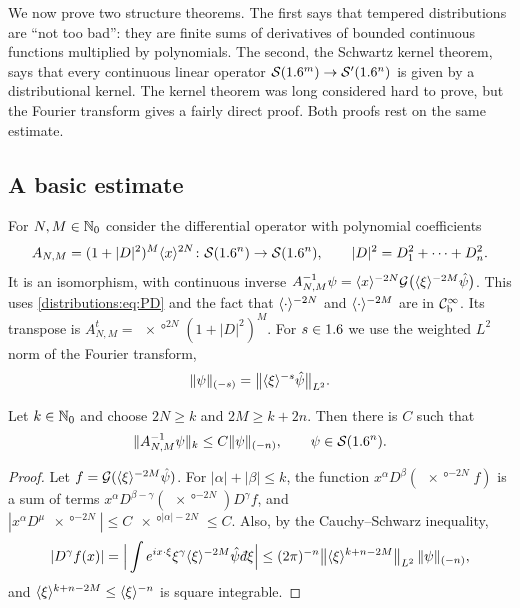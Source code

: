 We now prove two structure theorems. The first says that tempered distributions are
``not too bad'': they are finite sums of derivatives of bounded continuous functions
multiplied by polynomials. The second, the Schwartz kernel theorem, says that every
continuous linear operator $\mathcal{S}(1.6^m)\to\mathcal{S}'(1.6^n)$ is given by a distributional kernel.
The kernel theorem was long considered hard to prove, but the Fourier transform gives a
fairly direct proof. Both proofs rest on the same estimate.

\subsection{A basic estimate}
For $N,M\in\mathbb{N}_0$ consider the differential operator with polynomial coefficients
\[
  A_{N,M}=(1+|D|^2)^M\langle x\rangle^{2N}\colon\mathcal{S}(1.6^n)\to\mathcal{S}(1.6^n),\qquad
  |D|^2=D_1^2+\dots+D_n^2.
\]
It is an isomorphism, with continuous inverse
$A_{N,M}^{-1}\psi=\langle x\rangle^{-2N}\mathcal{G}\big(\langle \xi\rangle^{-2M}\hat\psi\big)$. This uses
\eqref{distributions:eq:PD} and the fact that $\langle \cdot\rangle^{-2N}$ and $\langle \cdot\rangle^{-2M}$
are in $\mathcal{C}^\infty_{\mathrm{b}}$. Its transpose is $A_{N,M}^t=\ang{x}^{2N}(1+|D|^2)^M$. For $s\in1.6$ we
use the weighted $L^2$ norm of the Fourier transform,
\[
  \lVert \psi\rVert_{(-s)}=\big\|\langle \xi\rangle^{-s}\hat\psi\big\|_{L^2}.
\]

\begin{lemma}\label{distributions:lem:basic-est}
Let $k\in\mathbb{N}_0$ and choose $2N\ge k$ and $2M\ge k+2n$. Then there is $C$ such that
\[
  \lVert A_{N,M}^{-1}\psi\rVert_k\le C\lVert \psi\rVert_{(-n)},\qquad\psi\in\mathcal{S}(1.6^n).
\]
\end{lemma}
\begin{proof}
Let $f=\mathcal{G}(\langle \xi\rangle^{-2M}\hat\psi)$. For $|\alpha|+|\beta|\le k$, the function
$x^\alpha D^\beta(\ang{x}^{-2N}f)$ is a sum of terms
$x^\alpha D^{\beta-\gamma}(\ang{x}^{-2N})D^\gamma f$, and
$|x^\alpha D^\mu\ang{x}^{-2N}|\le C\ang{x}^{|\alpha|-2N}\le C$. Also, by the
Cauchy--Schwarz inequality,
\[
  |D^\gamma f(x)|=\Big|\int e^{ix\cdot\xi}\xi^\gamma\ang{\xi}^{-2M}\hat\psi\,\dbar\xi\Big|
  \le(2\pi)^{-n}\big\|\ang{\xi}^{k+n-2M}\big\|_{L^2}\,\norm{\psi}_{(-n)},
\]
and $\langle \xi\rangle^{k+n-2M}\le\langle \xi\rangle^{-n}$ is square integrable.
\end{proof}

